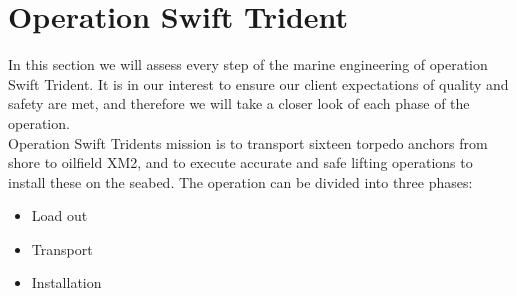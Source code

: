 \documentclass[a4paper,norsk]{article}
\begin{document}

\section*{Operation Swift Trident}
In this section we will assess every step of the marine engineering of operation Swift Trident. It is in our interest to ensure our client expectations of quality and safety are met, and therefore we will take a closer look of each phase of the operation.
\\
Operation Swift Tridents mission is to transport sixteen torpedo anchors from shore to oilfield XM2, and to execute accurate and safe lifting operations to install these on the seabed. The operation can be divided into three phases:  
\begin{itemize}
\item Load out
\item Transport
\item Installation 
\end{itemize}
\end{document}
